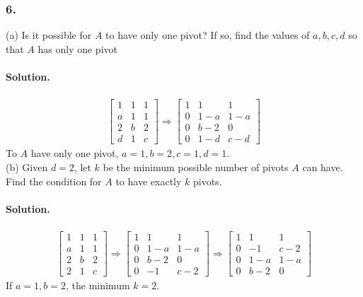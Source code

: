 \subsubsection{6.}
(a) Is it possible for $A$ to have only one pivot? If so, find the values of $a, b, c, d$ so that $A$ has only one pivot
\paragraph*{Solution.}
\begin{align*}
    \begin{bmatrix}
        1&1&1\\a&1&1\\2&b&2\\d&1&c
    \end{bmatrix} \Rightarrow \begin{bmatrix}
        1&1&1\\0&1-a&1-a\\0&b-2&0\\0&1-d&c-d
    \end{bmatrix}
\end{align*}
To $A$ have only one pivot, $a = 1, b = 2, c= 1, d = 1$.\\

(b) Given $d = 2$, let $k$ be the minimum possible number of pivots $A$ can have. Find the condition for $A$ to have exactly $k$ pivots.
\paragraph*{Solution.}
\begin{align*}
    \begin{bmatrix}
        1&1&1\\a&1&1\\2&b&2\\2&1&c
    \end{bmatrix} \Rightarrow \begin{bmatrix}
        1&1&1\\0&1-a&1-a\\0&b-2&0\\0&-1&c-2
    \end{bmatrix} \Rightarrow \begin{bmatrix}
        1&1&1\\0&-1&c-2\\0&1-a&1-a\\0&b-2&0
    \end{bmatrix}
\end{align*}
If $a = 1, b = 2$, the minimum $k = 2$.\\

